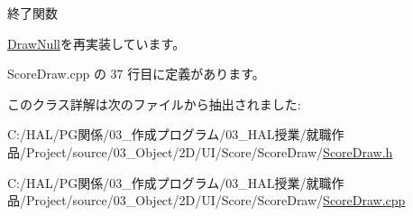 終了関数 



\mbox{\hyperlink{class_draw_null_a12d44e341c7364b5ab9cdd661dc16187}{Draw\+Null}}を再実装しています。



 Score\+Draw.\+cpp の 37 行目に定義があります。



このクラス詳解は次のファイルから抽出されました\+:\begin{DoxyCompactItemize}
\item 
C\+:/\+H\+A\+L/\+P\+G関係/03\+\_\+作成プログラム/03\+\_\+\+H\+A\+L授業/就職作品/\+Project/source/03\+\_\+\+Object/2\+D/\+U\+I/\+Score/\+Score\+Draw/\mbox{\hyperlink{_score_draw_8h}{Score\+Draw.\+h}}\item 
C\+:/\+H\+A\+L/\+P\+G関係/03\+\_\+作成プログラム/03\+\_\+\+H\+A\+L授業/就職作品/\+Project/source/03\+\_\+\+Object/2\+D/\+U\+I/\+Score/\+Score\+Draw/\mbox{\hyperlink{_score_draw_8cpp}{Score\+Draw.\+cpp}}\end{DoxyCompactItemize}
